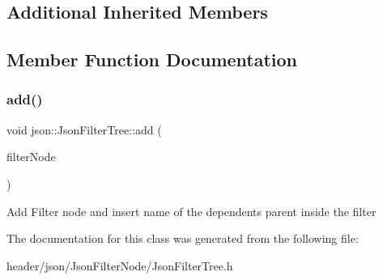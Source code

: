 \subsection*{Additional Inherited Members}


\subsection{Member Function Documentation}
\mbox{\label{classjson_1_1_json_filter_tree_aee36fd03a671233001426a3c6657f0f8}} 
\subsubsection{\texorpdfstring{add()}{add()}}
{\footnotesize\ttfamily void json\+::\+Json\+Filter\+Tree\+::add (\begin{DoxyParamCaption}\item[{\hyperlink{classjson_1_1_json_filter_node}{Json\+Filter\+Node} \&}]{filter\+Node }\end{DoxyParamCaption})\hspace{0.3cm}{\ttfamily [inline]}}

Add Filter node and insert name of the dependent\textquotesingle{}s parent inside the filter 

The documentation for this class was generated from the following file\+:\begin{DoxyCompactItemize}
\item 
header/json/\+Json\+Filter\+Node/Json\+Filter\+Tree.\+h\end{DoxyCompactItemize}

